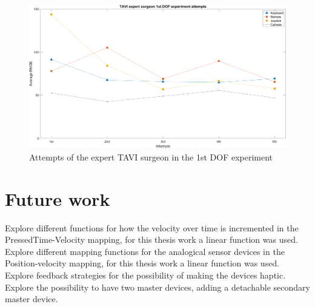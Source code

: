 \begin{figure}[ht]
   \centering
   \includegraphics[width=1.0\textwidth]{img/surgat.PNG}
   \caption{Attempts of the expert TAVI surgeon in the 1st DOF experiment}
   \label{img:surgeat}
\end{figure}
\clearpage

\section{Future work} \label{futurework}
Explore different functions for how the velocity over time is incremented in the PressedTime-Velocity mapping, for this thesis work a linear function was used.\\

Explore different mapping functions for the analogical sensor devices in the Position-velocity mapping, for this thesis work a linear function was used.\\

Explore feedback strategies for the possibility of making the devices haptic.\\

Explore the possibility to have two master devices, adding a detachable secondary master device.\\

